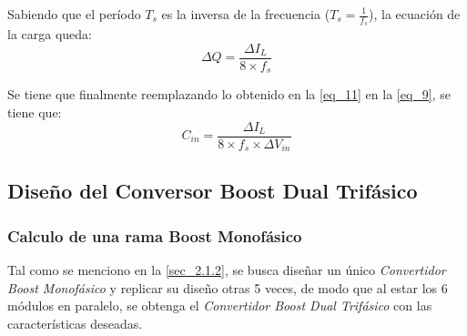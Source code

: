 \documentclass[12pt,a4paper]{article}
\begin{document}
Sabiendo que el período $T_{s}$ es la inversa de la frecuencia ($T_{s} = \frac{1}{f_{s}}$), la ecuación de la carga queda:
\begin{equation}
    \Delta Q = \frac{\Delta I_{L}}{8 \times f_{s}}
    \label{eq_11}
\end{equation}

Se tiene que finalmente reemplazando lo obtenido en la \autoref{eq_11} en la \autoref{eq_9}, se tiene que:
\begin{equation}
    C_{in} = \frac{\Delta I_{L}}{8 \times f_{s} \times \Delta V_{in}}
    \label{eq_12}
\end{equation}



\subsection{Diseño del Conversor Boost Dual Trifásico}                      \label{sec_2.2}
\subsubsection{Calculo de una rama Boost Monofásico}                        \label{sec_2.2.1}
Tal como se menciono en la \autoref{sec_2.1.2}, se busca diseñar un único \textit{Convertidor Boost Monofásico} y replicar su diseño otras 5 veces, de modo que al estar los 6 módulos en paralelo, se obtenga el \textit{Convertidor Boost Dual Trifásico} con las características deseadas.
\end{document}
